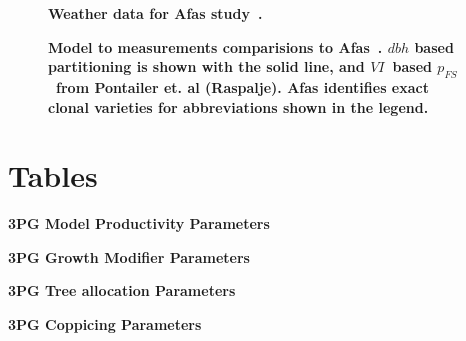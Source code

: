 \documentclass[10pt]{article}
\newcommand{\dbh}{\ensuremath{dbh}}
\newcommand{\pfs}{\ensuremath{p_{FS}}}
\newcommand{\VI}{\ensuremath{VI}}
\begin{document}
\begin{figure}%
\ifdefined\SHOWFIGS
  \centering
  
\fi
  \caption{{\bf Weather data for Afas\cite{Afas2008a} study~\cite{Geiger2002,TutiempoNetwork2013}. }}
  \label{fig:afras-weather}
\end{figure}

\begin{figure}%
\ifdefined\SHOWFIGS
  \centering
  
\fi
\caption{{\bf Model to measurements comparisions to Afas~\cite{Afas2008a}.  \dbh
    based partitioning is shown with the solid line, and \VI~based \pfs~from
    Pontailer et. al (Raspalje). Afas identifies exact clonal varieties for
    abbreviations shown in the legend.} }
\label{fig:afas-biomass}
\end{figure}

\ifdefined\SHOWDOC
\newpage
\section*{Tables}

\begin{table}%
\caption{\textbf{3PG Model Productivity Parameters}}

\label{tab:3pg-tree-productivity}
 \end{table}

\begin{table}%
\caption{\textbf{3PG Growth Modifier Parameters}}

\label{tab:3pg-tree-modifiers}
 \end{table}

\begin{table}%
\caption{\textbf{3PG Tree allocation Parameters}}

\label{tab:3pg-tree-allocate}
\end{table}

\begin{table}%
\caption{\textbf{3PG Coppicing Parameters}}

\label{tab:3pg-tree-coppice}
 \end{table}
\end{document}

